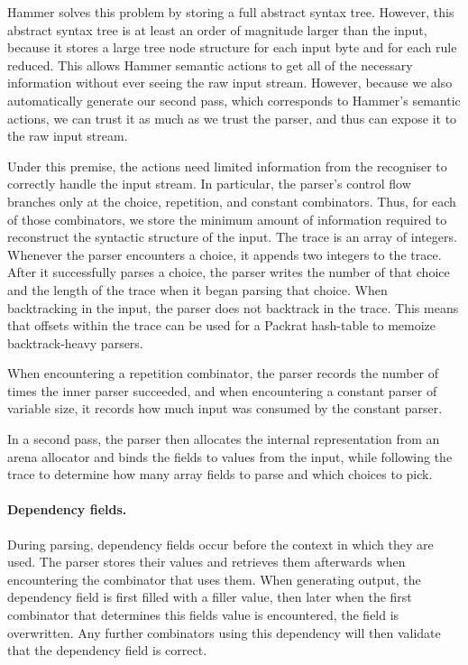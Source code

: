 Hammer solves this problem by storing a full abstract syntax tree. However, this
abstract syntax tree is at least an order of magnitude larger than the input,
because it stores a large tree node structure for each input byte and for each
rule reduced. This allows Hammer semantic actions to get all of the necessary
information without ever seeing the raw input stream. However, because we also
automatically generate our second pass, which corresponds to Hammer's semantic
actions, we can trust it as much as we trust the parser, and thus can expose it
to the raw input stream.

Under this premise, the actions need limited information from the
recogniser to correctly handle the input stream. In particular, the parser's
control flow branches only at the choice, repetition, and constant combinators.
Thus, for each of those combinators, we store the minimum amount of information
required to reconstruct the syntactic structure of the input. The trace is an
array of integers.
Whenever the parser encounters a choice, it appends two integers to the trace. After it
successfully parses a choice, the parser writes the number of that choice and
the length of the trace when it began parsing that choice. When backtracking in
the input, the parser does not backtrack in the trace. This means that offsets
within the trace can be used for a Packrat hash-table to memoize backtrack-heavy
parsers.

When encountering a repetition combinator, the parser records the number of
times the inner parser succeeded, and when encountering a constant parser of
variable size, it records how much input was consumed by the constant parser. 

In a second pass, the parser then allocates the internal representation from an
arena allocator and binds the fields to values from the input, while following
the trace to determine how many array fields to parse and which choices to pick.

\paragraph{Dependency fields.}

During parsing, dependency fields occur before the context in which they are
used. The parser stores their values and retrieves them afterwards when
encountering the combinator that uses them. When generating output, the
dependency field is first filled with a filler value, then later when the first
combinator that determines this fields value is encountered, the field is
overwritten. Any further combinators using this dependency will then validate
that the dependency field is correct.

